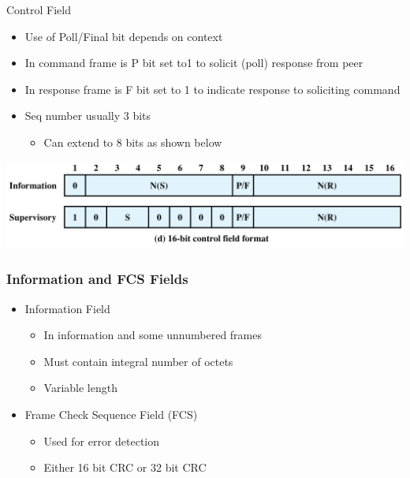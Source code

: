 \documentclass[pdflatex,compress]{beamer}
\begin{document}
\begin{frame}{Control Field}
	\begin{itemize}
		\item Use of Poll/Final bit depends on context
		\item In command frame is P bit set to1 to solicit (poll) response from peer
		\item In response frame is F bit set to 1 to indicate response to soliciting command
		\item Seq number usually 3 bits
		\begin{itemize}
			\item Can extend to 8 bits as shown below
		\end{itemize}
	\end{itemize}
	\begin{center}
		\includegraphics[width=\textwidth]{img/img12}
	\end{center}
\end{frame}

\begin{frame}
	\frametitle{Information and FCS Fields}
	\begin{itemize}
		\item Information Field
		\begin{itemize}
			\item In information and some unnumbered frames
			\item Must contain integral number of octets
			\item Variable length
		\end{itemize}
		\item Frame Check Sequence Field (FCS)
		\begin{itemize}
			\item Used for error detection
			\item Either 16 bit CRC or 32 bit CRC
		\end{itemize}
	\end{itemize}
\end{frame}
\end{document}
